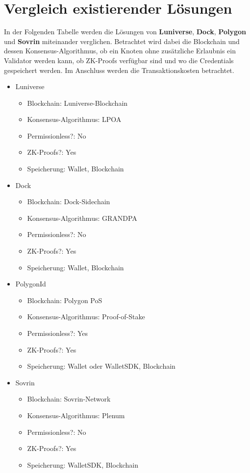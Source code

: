 \section{Vergleich existierender Lösungen}
\label{cha:vergleich Lösungen}
In der Folgenden Tabelle werden die Lösungen von \textbf{Luniverse}, \textbf{Dock}, \textbf{Polygon} und \textbf{Sovrin} miteinander verglichen. Betrachtet wird dabei die Blockchain und dessen Konsensus-Algorithmus, ob ein Knoten ohne zusätzliche Erlaubnis ein Validator werden kann, ob ZK-Proofs verfügbar sind und wo die Credentials gespeichert werden. Im Anschluss werden die Transaktionskosten betrachtet.

\begin{itemize}
	
	
	
	\item Luniverse
	\begin{itemize}
		\item Blockchain: Luniverse-Blockchain
		\item Konsensus-Algorithmus: LPOA
		\item Permissionless?: No
		\item ZK-Proofs?: Yes
		\item Speicherung: Wallet, Blockchain
	\end{itemize}
	
	\item Dock
	\begin{itemize}
		\item Blockchain: Dock-Sidechain
		\item Konsensus-Algorithmus: GRANDPA
		\item Permissionless?: No
		\item ZK-Proofs?: Yes
		\item Speicherung: Wallet, Blockchain
	\end{itemize}
	
	\item PolygonId
	\begin{itemize}
		\item Blockchain: Polygon PoS
		\item Konsensus-Algorithmus: Proof-of-Stake
		\item Permissionless?: Yes
		\item ZK-Proofs?: Yes
		\item Speicherung: Wallet oder WalletSDK, Blockchain
	\end{itemize}
	
	\item Sovrin
	\begin{itemize}
		\item Blockchain: Sovrin-Network
		\item Konsensus-Algorithmus: Plenum
		\item Permissionless?: No
		\item ZK-Proofs?: Yes
		\item Speicherung: WalletSDK, Blockchain
	\end{itemize}
	

\end{itemize}
